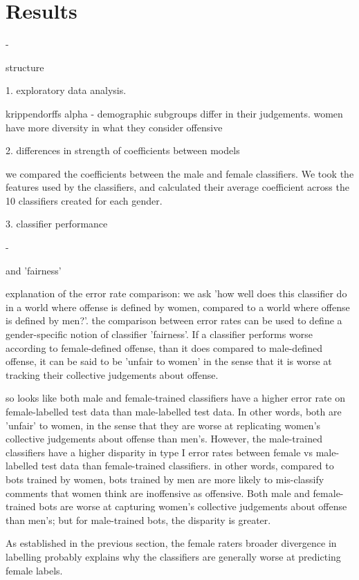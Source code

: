 \documentclass[runningheads,a4paper]{llncs}
\begin{document}
\section{Results}





-

structure

1. exploratory data analysis.

krippendorffs alpha - demographic subgroups differ in their judgements.
women have more diversity in what they consider offensive

2. differences in strength of coefficients between models

we compared the coefficients between the male and female classifiers. We took the features used by the classifiers, and calculated their average coefficient across the 10 classifiers created for each gender. 

3. classifier performance


-

and 'fairness'

explanation of the error rate comparison: we ask 'how well does this classifier do in a world where offense is defined by women, compared to a world where offense is defined by men?'. the comparison between error rates can be used to define a gender-specific notion of classifier 'fairness'. If a classifier performs worse according to female-defined offense, than it does compared to male-defined offense, it can be said to be 'unfair to women' in the sense that it is worse at tracking their collective judgements about offense.



so looks like both male and female-trained classifiers have a higher error rate on female-labelled test data than male-labelled test data. In other words, both are 'unfair' to women, in the sense that they are worse at replicating women's collective judgements about offense than men's. However, the male-trained classifiers have a higher disparity in type I error rates between female vs male-labelled test data than female-trained classifiers. in other words, compared to bots trained by women, bots trained by men are more likely to mis-classify comments that women think are inoffensive as offensive. Both male and female-trained bots are worse at capturing women's collective judgements about offense than men's; but for male-trained bots, the disparity is greater.

As established in the previous section, the female raters broader divergence in labelling probably explains why the classifiers are generally worse at predicting female labels.
\end{document}
